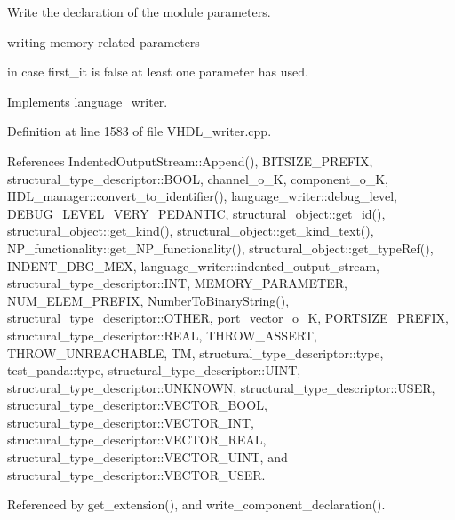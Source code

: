 Write the declaration of the module parameters. 

writing memory-\/related parameters

in case first\+\_\+it is false at least one parameter has used. 

Implements \hyperlink{classlanguage__writer_ad14ee8909894bca0a7d8874554d91d9b}{language\+\_\+writer}.



Definition at line 1583 of file V\+H\+D\+L\+\_\+writer.\+cpp.



References Indented\+Output\+Stream\+::\+Append(), B\+I\+T\+S\+I\+Z\+E\+\_\+\+P\+R\+E\+F\+IX, structural\+\_\+type\+\_\+descriptor\+::\+B\+O\+OL, channel\+\_\+o\+\_\+K, component\+\_\+o\+\_\+K, H\+D\+L\+\_\+manager\+::convert\+\_\+to\+\_\+identifier(), language\+\_\+writer\+::debug\+\_\+level, D\+E\+B\+U\+G\+\_\+\+L\+E\+V\+E\+L\+\_\+\+V\+E\+R\+Y\+\_\+\+P\+E\+D\+A\+N\+T\+IC, structural\+\_\+object\+::get\+\_\+id(), structural\+\_\+object\+::get\+\_\+kind(), structural\+\_\+object\+::get\+\_\+kind\+\_\+text(), N\+P\+\_\+functionality\+::get\+\_\+\+N\+P\+\_\+functionality(), structural\+\_\+object\+::get\+\_\+type\+Ref(), I\+N\+D\+E\+N\+T\+\_\+\+D\+B\+G\+\_\+\+M\+EX, language\+\_\+writer\+::indented\+\_\+output\+\_\+stream, structural\+\_\+type\+\_\+descriptor\+::\+I\+NT, M\+E\+M\+O\+R\+Y\+\_\+\+P\+A\+R\+A\+M\+E\+T\+ER, N\+U\+M\+\_\+\+E\+L\+E\+M\+\_\+\+P\+R\+E\+F\+IX, Number\+To\+Binary\+String(), structural\+\_\+type\+\_\+descriptor\+::\+O\+T\+H\+ER, port\+\_\+vector\+\_\+o\+\_\+K, P\+O\+R\+T\+S\+I\+Z\+E\+\_\+\+P\+R\+E\+F\+IX, structural\+\_\+type\+\_\+descriptor\+::\+R\+E\+AL, T\+H\+R\+O\+W\+\_\+\+A\+S\+S\+E\+RT, T\+H\+R\+O\+W\+\_\+\+U\+N\+R\+E\+A\+C\+H\+A\+B\+LE, TM, structural\+\_\+type\+\_\+descriptor\+::type, test\+\_\+panda\+::type, structural\+\_\+type\+\_\+descriptor\+::\+U\+I\+NT, structural\+\_\+type\+\_\+descriptor\+::\+U\+N\+K\+N\+O\+WN, structural\+\_\+type\+\_\+descriptor\+::\+U\+S\+ER, structural\+\_\+type\+\_\+descriptor\+::\+V\+E\+C\+T\+O\+R\+\_\+\+B\+O\+OL, structural\+\_\+type\+\_\+descriptor\+::\+V\+E\+C\+T\+O\+R\+\_\+\+I\+NT, structural\+\_\+type\+\_\+descriptor\+::\+V\+E\+C\+T\+O\+R\+\_\+\+R\+E\+AL, structural\+\_\+type\+\_\+descriptor\+::\+V\+E\+C\+T\+O\+R\+\_\+\+U\+I\+NT, and structural\+\_\+type\+\_\+descriptor\+::\+V\+E\+C\+T\+O\+R\+\_\+\+U\+S\+ER.



Referenced by get\+\_\+extension(), and write\+\_\+component\+\_\+declaration().

